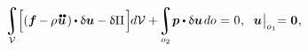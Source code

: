 \begin{minipage}{\linewidth}
\begin{itemize}
{{\nopagebreak\vspace{-0.2em}
\begin{equation}\label{lineartheory:principleofvirtualwork}
\displaystyle\integral\displaylimits_{\mathcal{V}}
\hspace{-0.2ex} \Bigl[
    \left(
        \bm{f}
        \hspace{-0.1ex} - \hspace{-0.1ex}
        \rho \hspace{.1ex}
        \mathdotdotabove{\bm{u}}
        \hspace{.2ex}
    \right)
    \hspace{-0.1ex}
    \dotp
    \variation{\bm{u}} - \variation{\potential}
\hspace{.25ex} \Bigr]
\hspace{-0.2ex} d\mathcal{V}
+ \hspace{-0.3ex}
\displaystyle\integral\displaylimits_{o_2} \hspace{-0.4ex} \bm{p} \dotp \variation{\bm{u}} \hspace{.25ex} do \hspace{.1ex}
= \hspace{.1ex} 0
\hspace{.1ex} ,
\hspace{.6em}
%
\bm{u} \hspace{.1ex}
\bigr|_{o_1}
\hspace{-0.64ex} = \hspace{.1ex}
\bm{0}
\hspace{.1ex} ,
\vspace{-0.2em}
\end{equation}

\noindent\vspace{-0.2em}

}}
\end{itemize}
\end{minipage}
